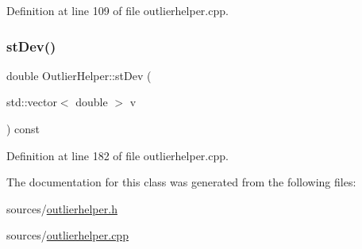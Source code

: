 Definition at line 109 of file outlierhelper.\+cpp.

\mbox{\label{class_outlier_helper_a329143b98163a03aa80a2950b3b1d8cf}} 
\subsubsection{\texorpdfstring{st\+Dev()}{stDev()}}
{\footnotesize\ttfamily double Outlier\+Helper\+::st\+Dev (\begin{DoxyParamCaption}\item[{std\+::vector$<$ double $>$}]{v }\end{DoxyParamCaption}) const}



Definition at line 182 of file outlierhelper.\+cpp.



The documentation for this class was generated from the following files\+:\begin{DoxyCompactItemize}
\item 
sources/\mbox{\hyperlink{outlierhelper_8h}{outlierhelper.\+h}}\item 
sources/\mbox{\hyperlink{outlierhelper_8cpp}{outlierhelper.\+cpp}}\end{DoxyCompactItemize}

